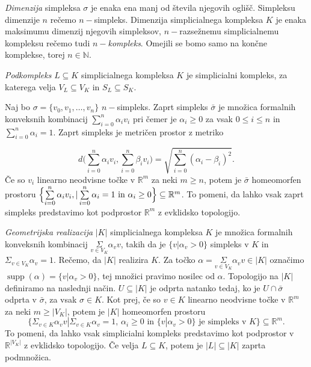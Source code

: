 \documentclass[mat1]{fmfdelo}
\DeclareRobustCommand{\si}{
    \bar{\sigma}}
\DeclareMathOperator*{\supp}{supp}
\newcommand{\R}{\mathbb R}
\newcommand{\N}{\mathbb N}
\begin{document}
\emph{Dimenzija} simpleksa $\sigma$ je enaka ena manj od števila njegovih oglišč. Simpleksu dimenzije $n$ rečemo $n-$simpleks. Dimenzija simplicialnega kompleksa $K$ je enaka maksimumu dimenzij njegovih simpleksov, $n-$razsežnemu simplicialnemu kompleksu rečemo tudi \emph{$n-$kompleks}. Omejili se bomo samo na končne komplekse, torej $n \in \N$.


\emph{Podkompleks} $L\subseteq K$ simplicialnega kompleksa $K$ je simplicialni kompleks, za katerega velja $V_L\subseteq V_K$ in $S_L\subseteq S_K$.


 Naj bo $\sigma = \{v_0,v_1,\ldots,v_n\}$ $n-$simpleks. Zaprt
 simpleks $\bar{\sigma}$ je množica formalnih konveksnih kombinacij $\sum\limits_{i=0}^{n}\alpha_i v_i$
 pri čemer je $\alpha_i \ge 0$ za vsak $0\le i \le n$ in $\sum\limits_{i=0}^{n}\alpha_i = 1$. Zaprt simpleks je metričen prostor z metriko
 
 \begin{equation}
     d\biggl(\sum\limits_{i=0}^{n}\alpha_i v_i,\sum\limits_{i=0}^{n}\beta_i v_i \biggr) = \sqrt{\sum\limits_{i=0}^{n}(\alpha_i - \beta_i)^2}.
     \label{eq:metrika}    
 \end{equation}
 Če so $v_i$ linearno neodvisne točke v $\R^m$ za neki $m\geq n$, potem je $\bar{\sigma}$ homeomorfen prostoru 
 $\Bigl\{ \sum\limits_{i=0}^{n}\alpha_i v_i, | \sum\limits_{i=0}^{n}\alpha_i = 1 \text{ in } \alpha_i \ge 0 \Bigr\}\subseteq \R^m$. To pomeni, da lahko vsak zaprt simpleks predstavimo kot podprostor $\R^m$ z evklidsko topologijo.


 \emph{Geometrijska realizacija} $|K|$ simplicialnega kompleksa $K$ je 
 množica formalnih konveksnih kombinacij $\underset{v \in V_K}{\Sigma}\alpha_v v$, takih da je $\{v | \alpha_v > 0\}$ simpleks v $K$ in 
 $\Sigma_{v\in V_K}\alpha_v=1$. Rečemo, da $|K|$ realizira $K$. Za točko $\alpha=\underset{v \in V_K}{\Sigma}\alpha_v v \in |K|$ označimo $\supp(\alpha)=\{v | \alpha_v > 0\}$, 
 tej množici pravimo nosilec od $\alpha$. Topologijo na $|K|$ definiramo na naslednji način. $U \subseteq |K|$ je odprta natanko tedaj, ko je $U \cap 
 \si$ odprta v $\si$, za vsak $\sigma \in K$. Kot prej, če so $v\in K$ linearno neodvisne točke v $\R^m$ za neki $m\geq |V_K|$, potem je 
 $|K|$ homeomorfen prostoru 
 $$\bigl\{\Sigma_{v\in K}\alpha_v v | \Sigma_{v\in K} \alpha_v = 1 \text{, } \alpha_i
 \ge 0 \text{ in } \{v | \alpha_v > 0\} \text{ je simpleks v $K$}\bigr\} \subseteq \R^m.$$ To pomeni, da lahko vsak simplicialni
 kompleks predstavimo kot podprostor v $\R^{|V_K|}$ z evklidsko topologijo.
 Če velja $L\subseteq K$, potem je $|L|\subseteq |K|$ zaprta podmnožica.
 
\end{document}
